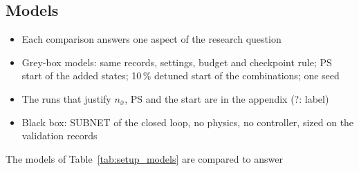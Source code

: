\subsection{Models}\label{sec:setup_models}
\ifdraft
\begin{itemize}
\item Each comparison answers one aspect of the research question
\item Grey-box models: same records, settings, budget and checkpoint rule; PS start of the added states; 10\,\% detuned start of the combinations; one seed
\item The runs that justify $n_{\bar x}$, PS and the start are in the appendix (?: label)
\item Black box: SUBNET of the closed loop, no physics, no controller, sized on the validation records
\end{itemize}
\fi
The models of Table~\ref{tab:setup_models} are compared to answer 
